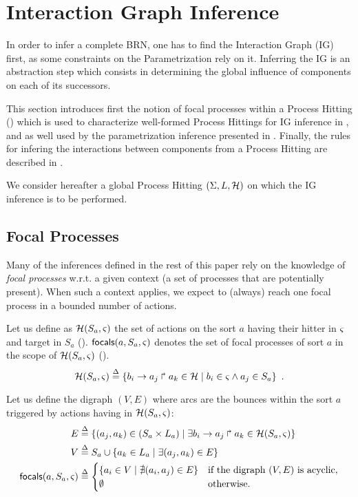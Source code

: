 \section{Interaction Graph Inference}\label{sec:infer-IG}

In order to infer a complete BRN, one has to find the Interaction Graph (IG) first, as some
constraints on the Parametrization rely on it.
Inferring the IG is an abstraction step which consists in determining the global influence of
components on each of its successors.

This section introduces first the notion of focal processes within a Process Hitting
() which is used to characterize well-formed Process Hittings for IG inference
in , and as well used by the parametrization inference presented in .
Finally, the rules for infering the interactions between components from a Process Hitting are
described in .

We consider hereafter a global Process Hitting $(\Sigma,L,\mathcal{H})$ on which the IG inference is to be
performed.

\subsection{Focal Processes}\label{ssec:focal}

Many of the inferences defined in the rest of this paper rely on the knowledge of \emph{focal
processes} w.r.t. a given context (a set of processes that are potentially present).
When such a context applies, we expect to (always) reach one focal process in a bounded number of
actions.

Let us define as $\mathcal{H}(S_a,\varsigma)$ the set of actions on the sort $a$ having their hitter in
$\varsigma$ and target in $S_a$ ().
$\mathsf{focals}(a,S_a,\varsigma)$ denotes the set of focal processes of sort $a$ in the scope of
$\mathcal{H}(S_a,\varsigma)$ ().
\begin{equation}
\mathcal{H}(S_a,\varsigma) \stackrel{\Delta}= \{ b_i\rightarrow a_j\Rsh a_k\in\mathcal{H} \mid b_i\in\varsigma \wedge a_j\in S_a \}
\enspace.
\label{eq:PHa-ctx}
\end{equation}
\begin{definition}\label{def:focals}
Let us define the digraph $(V, E)$ where arcs are the bounces within the sort $a$
triggered by actions having in $\mathcal{H}(S_a,\varsigma)$:
\begin{align*}
E  & \stackrel{\Delta}= \{(a_j,a_k)\in (S_a \times L_a) \mid 
			\exists b_i\rightarrow a_j\Rsh a_k\in \mathcal{H}(S_a,\varsigma) \}
\\
V & \stackrel{\Delta}= S_a \cup \{ a_k\in L_a\mid \exists (a_j,a_k)\in E\}\\
\mathsf{focals}(a,S_a,\varsigma) & \stackrel{\Delta}=
\begin{cases}
\{ a_i \in V \mid \nexists (a_i,a_j)\in E\} & \text{if the digraph $(V,E)$ is acyclic},\\
\emptyset & \text{otherwise.}\\
\end{cases}
\end{align*}
\end{definition}

